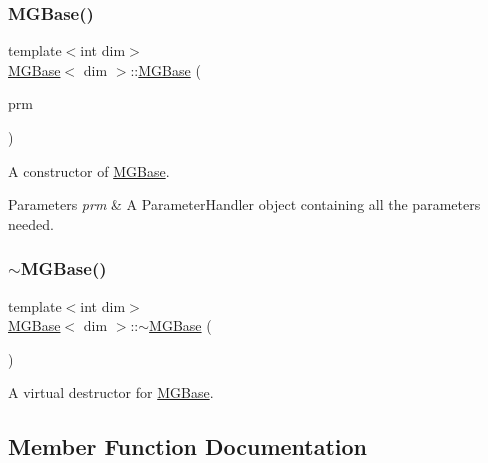 \subsubsection{\texorpdfstring{M\+G\+Base()}{MGBase()}}
{\footnotesize\ttfamily template$<$int dim$>$ \\
\hyperlink{class_m_g_base}{M\+G\+Base}$<$ dim $>$\+::\hyperlink{class_m_g_base}{M\+G\+Base} (\begin{DoxyParamCaption}\item[{const Parameter\+Handler \&}]{prm }\end{DoxyParamCaption})}

A constructor of \hyperlink{class_m_g_base}{M\+G\+Base}.


\begin{DoxyParams}{Parameters}
{\em prm} & A Parameter\+Handler object containing all the parameters needed. \\
\hline
\end{DoxyParams}
\mbox{\label{class_m_g_base_a011e50e1caf44cfa3335b95d161ba14d}} 
\subsubsection{\texorpdfstring{$\sim$\+M\+G\+Base()}{~MGBase()}}
{\footnotesize\ttfamily template$<$int dim$>$ \\
\hyperlink{class_m_g_base}{M\+G\+Base}$<$ dim $>$\+::$\sim$\hyperlink{class_m_g_base}{M\+G\+Base} (\begin{DoxyParamCaption}{ }\end{DoxyParamCaption})\hspace{0.3cm}{\ttfamily [virtual]}}



A virtual destructor for \hyperlink{class_m_g_base}{M\+G\+Base}. 



\subsection{Member Function Documentation}
\mbox{\label{class_m_g_base_a3586c47d901608bc42792c6de456b1cb}} 
